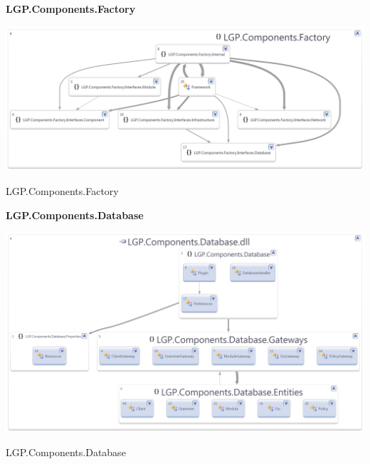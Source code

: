 		
\newpage
	
	
	\large{\bfseries{LGP.Components.Factory}}
	\vspace{5mm}
	
		\begin{figurehere}
			\centering
			\includegraphics[scale=0.6,angle=90]{pages/appendix3/figures/dllscreens/factory.png}
		\caption{LGP.Components.Factory}
		\end{figurehere}
	
	\newpage
	
	
	\large{\bfseries{LGP.Components.Database}}
	\vspace{5mm}
	
		\begin{figurehere}
			\centering
			\includegraphics[scale=0.8,angle=90]{pages/appendix3/figures/dllscreens/database.png}
			\caption{LGP.Components.Database}
		\end{figurehere}
	
	
\newpage
		

